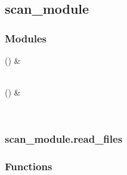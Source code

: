 \documentclass[a4paper,11pt,russian,openany,oneside]{sphinxmanual}
\begin{document}
\sphinxstepscope


\subsection{scan\_module}
\label{\detokenize{_autosummary/scan_module:module-scan_module}}\label{\detokenize{_autosummary/scan_module:scan-module}}\label{\detokenize{_autosummary/scan_module::doc}}\subsubsection*{Modules}


\begin{savenotes}\sphinxattablestart
\sphinxthistablewithglobalstyle
\sphinxthistablewithnovlinesstyle
\centering
\begin{tabulary}{\linewidth}[t]{}
\sphinxtoprule
\sphinxtableatstartofbodyhook
\sphinxAtStartPar
{\hyperref[\detokenize{scan_module:module-scan_module.read_files}]{}} ()
&
\sphinxAtStartPar

\\
\sphinxhline
\sphinxAtStartPar
{\hyperref[\detokenize{scan_module:module-scan_module.read_layout}]{}} ()
&
\sphinxAtStartPar

\\
\sphinxbottomrule
\end{tabulary}
\sphinxtableafterendhook\par
\sphinxattableend\end{savenotes}

\sphinxstepscope


\subsubsection{scan\_module.read\_files}
\label{\detokenize{_autosummary/scan_module.read_files:module-scan_module.read_files}}\label{\detokenize{_autosummary/scan_module.read_files:scan-module-read-files}}\label{\detokenize{_autosummary/scan_module.read_files::doc}}\subsubsection*{Functions}
\end{document}
